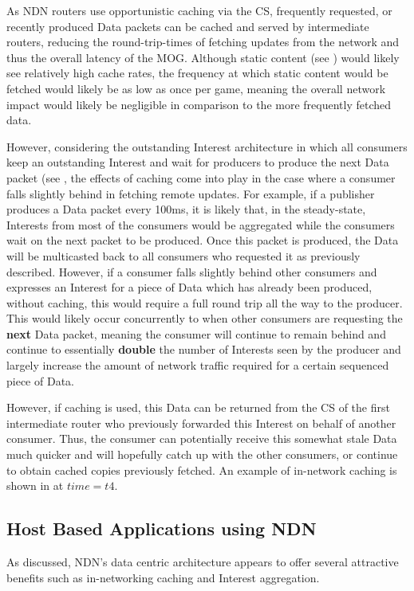 As NDN routers use opportunistic caching via the CS, frequently requested, or recently produced Data packets can be cached and served by intermediate routers, reducing the round-trip-times of fetching updates from the network and thus the overall latency of the MOG. Although static content (see ) would likely see relatively high cache rates, the frequency at which static content would be fetched would likely be as low as once per game, meaning the overall network impact would likely be negligible in comparison to the more frequently fetched data. 

However, considering the outstanding Interest architecture in which all consumers keep an outstanding Interest and wait for producers to produce the next Data packet (see , the effects of caching come into play in the case where a consumer falls slightly behind in fetching remote updates. For example, if a publisher produces a Data packet every 100ms, it is likely that, in the steady-state, Interests from most of the consumers would be aggregated while the consumers wait on the next packet to be produced. Once this packet is produced, the Data will be multicasted back to all consumers who requested it as previously described. However, if a consumer falls slightly behind other consumers and expresses an Interest for a piece of Data which has already been produced, without caching, this would require a full round trip all the way to the producer. This would likely occur concurrently to when other consumers are requesting the \textbf{next} Data packet, meaning the consumer will continue to remain behind and continue to essentially \textbf{double} the number of Interests seen by the producer and largely increase the amount of network traffic required for a certain sequenced piece of Data.  

However, if caching is used, this Data can be returned from the CS of the first intermediate router who previously forwarded this Interest on behalf of another consumer. Thus, the consumer can potentially receive this somewhat stale Data much quicker and will hopefully catch up with the other consumers, or continue to obtain cached copies previously fetched. An example of in-network caching is shown in  at $time = t4$.






\subsection{Host Based Applications using NDN}\label{sec:ndn-host-based}
As discussed, NDN's data centric architecture appears to offer several attractive benefits such as in-networking caching and Interest aggregation. 

